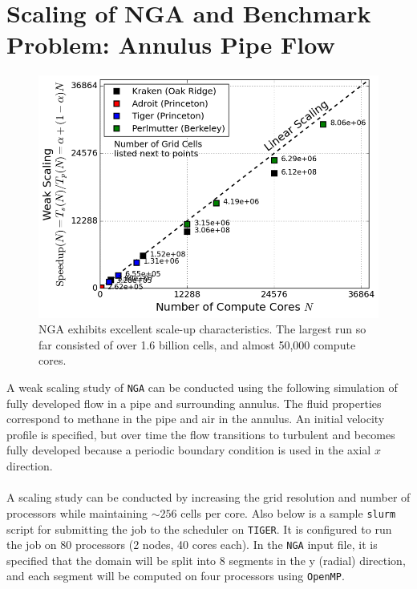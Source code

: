 \documentclass{homework}
\begin{document}
\section{\textbf{Scaling of NGA and Benchmark Problem: Annulus Pipe Flow}} \label{appendixC}
\begin{figure}[h!]
    \centering
    \includegraphics[width=0.6\linewidth]{NGA_scaling.png}
    \caption{NGA exhibits excellent scale-up characteristics. The largest run so far consisted of over 1.6 billion cells, and almost 50,000 compute cores.}
    \label{fig:Scaleup2}
\end{figure}
\noindent A weak scaling study of \texttt{NGA} can be conducted using the following simulation of fully developed flow in a pipe and surrounding annulus. The fluid properties correspond to methane in the pipe and air in the annulus. An initial velocity profile is specified, but over time the flow transitions to turbulent and becomes fully developed because a periodic boundary condition is used in the axial $x$ direction.
\\ \\ \noindent
A scaling study can be conducted by increasing the grid resolution and number of processors while maintaining $\sim 256$ cells per core. Also below is a sample \texttt{slurm} script for submitting the job to the scheduler on \texttt{TIGER}. It is configured to run the job on 80 processors (2 nodes, 40 cores each). In the \texttt{NGA} input file, it is specified that the domain will be split into 8 segments in the y (radial) direction, and each segment will be computed on four processors using \texttt{OpenMP}. 
\small
\end{document}
